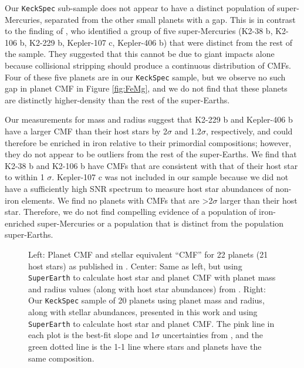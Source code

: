 \documentclass[twocolumn]{aastex631}
\begin{document}
\begin{table}[]
\end{table}


Our \texttt{KeckSpec} sub-sample does not appear to have a distinct population of super-Mercuries, separated from the other small planets with a gap. This is in contrast to the finding of \cite{Adibekyan2021}, who identified a group of five super-Mercuries (K2-38 b, K2-106 b, K2-229 b, Kepler-107 c, Kepler-406 b) that were distinct from the rest of the sample. They suggested that this cannot be due to giant impacts alone because collisional stripping should produce a continuous distribution of CMFs. Four of these five planets are in our \texttt{KeckSpec} sample, but we observe no such gap in planet CMF in Figure \ref{fig:FeMg}, and we do not find that these planets are distinctly higher-density than the rest of the super-Earths. 

Our measurements for mass and radius suggest that K2-229 b and Kepler-406 b have a larger CMF than their host stars by 2$\sigma$ and 1.2$\sigma$, respectively, and could therefore be enriched in iron relative to their primordial compositions; however, they do not appear to be outliers from the rest of the super-Earths. We find that K2-38 b and K2-106 b have CMFs that are consistent with that of their host star to within 1 $\sigma$. Kepler-107 c was not included in our sample because we did not have a sufficiently high SNR spectrum to measure host star abundances of non-iron elements. We find no planets with CMFs that are >2$\sigma$ larger than their host star. Therefore, we do not find compelling evidence of a population of iron-enriched super-Mercuries or a population that is distinct from the population super-Earths. 

\begin{figure}
\centering
{}
 \caption{Left: Planet CMF and stellar equivalent ``CMF'' for 22 planets (21 host stars) as published in \cite{Adibekyan2021}. Center: Same as left, but using \texttt{SuperEarth} to calculate host star and planet CMF with planet mass and radius values (along with host star abundances) from \cite{Adibekyan2021}. Right: Our \texttt{KeckSpec} sample of 20 planets using planet mass and radius, along with stellar abundances, presented in this work and using \texttt{SuperEarth} to calculate host star and planet CMF. The pink line in each plot is the best-fit slope and 1$\sigma$ uncertainties from \cite{Adibekyan2021}, and the green dotted line is the 1-1 line where stars and planets have the same composition.}
    \label{fig:cmf_comparison}
\end{figure}
\end{document}
